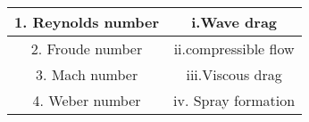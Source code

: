 \begin{tabular}{|c|c|}
    \hline
   1. Reynolds number& i.Wave drag \\ \hline
    2. Froude number& ii.compressible flow \\ \hline
    3. Mach number & iii.Viscous drag \\ \hline
    4. Weber number & iv. Spray formation \\ \hline
\end{tabular}